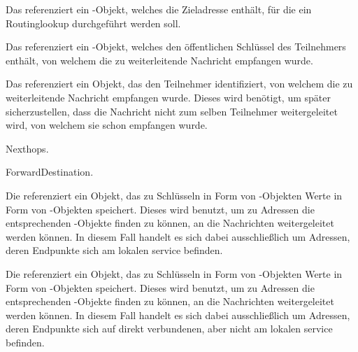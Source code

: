 \begin{description}

		Das \javaarg {} referenziert ein -Objekt,
		welches die Zieladresse enthält, für die ein Routinglookup durchgeführt werden soll.

		Das \javaarg {} referenziert ein -Objekt, welches
		den öffentlichen Schlüssel des Teilnehmers enthält, von welchem die zu weiterleitende
		Nachricht empfangen wurde.

		Das \javaarg {} referenziert ein Objekt, das den Teilnehmer
		identifiziert, von welchem die zu weiterleitende Nachricht empfangen wurde. Dieses wird
		benötigt, um später sicherzustellen, dass die Nachricht nicht zum selben Teilnehmer
		weitergeleitet wird, von welchem sie schon empfangen wurde.

		\glsdesc{Nexthops}.

		\glsdesc{ForwardDestination}.

		Die \javainstvar {} referenziert ein Objekt, das zu Schlüsseln
		in Form von -Objekten Werte in Form von -Objekten
		speichert. Dieses wird benutzt, um zu Adressen die entsprechenden
		-Objekte finden zu können, an die Nachrichten weitergeleitet werden
		können. In diesem Fall handelt es sich dabei ausschließlich um Adressen, deren Endpunkte
		sich am lokalen \gls{service} befinden.

		Die \javainstvar {} referenziert ein Objekt, das zu Schlüsseln
		in Form von -Objekten Werte in Form von -Objekten
		speichert. Dieses wird benutzt, um zu Adressen die entsprechenden
		-Objekte finden zu können, an die Nachrichten weitergeleitet werden
		können. In diesem Fall handelt es sich dabei ausschließlich um Adressen, deren Endpunkte
		sich auf direkt verbundenen, aber nicht am lokalen \gls{service} befinden.

\end{description}

